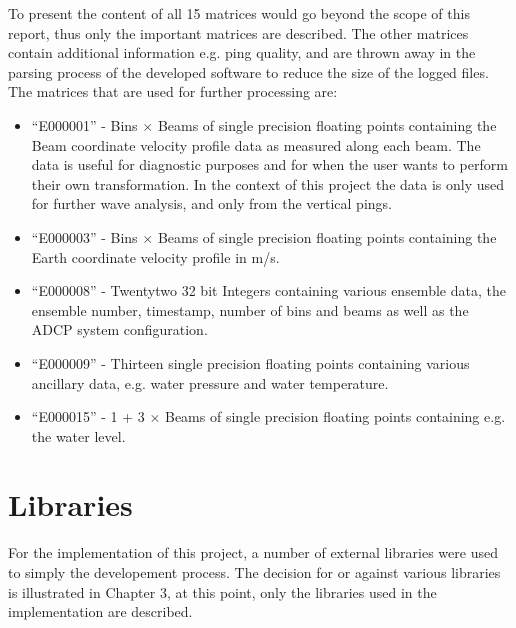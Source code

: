 To present the content of all 15 matrices would go beyond the scope of this report, thus only the important matrices are described. The other matrices contain additional information e.g. ping quality, and are thrown away in the parsing process of the developed software to reduce the size of the logged files.\\
The matrices that are used for further processing are:
\begin{itemize}
\item ``E000001'' - Bins $\times$ Beams of single precision floating points containing  the Beam coordinate velocity profile data as measured along each beam. The data is useful for diagnostic purposes and for when the user wants to perform their own transformation. In the context of this project the data is only used for further wave analysis, and only from the vertical pings.
\item``E000003'' - Bins $\times$ Beams of single precision floating points containing the Earth coordinate velocity profile in m/s. 
\item ``E000008'' - Twentytwo 32 bit Integers containing various ensemble data, the ensemble number, timestamp, number of bins and beams as well as the ADCP system configuration.
\item ``E000009'' - Thirteen single precision floating points containing various ancillary data, e.g. water pressure and water temperature.
\item ``E000015'' - 1 + 3 $\times$ Beams of single precision floating points containing e.g. the water level. 
\end{itemize}

\section{Libraries}
For the implementation of this project, a number of external libraries were used to simply the developement process. The decision for or against various libraries is illustrated in Chapter 3, at this point, only the libraries used in the implementation are described.
